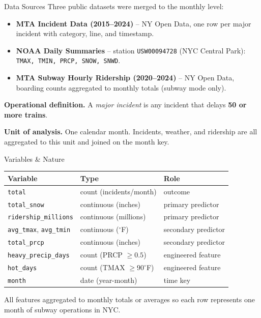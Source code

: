 \documentclass[aspectratio=43]{beamer}
\begin{document}
\begin{frame}{Data Sources}
Three public datasets were merged to the monthly level:
\begin{itemize}
  \item \textbf{MTA Incident Data (2015--2024)} -- NY Open Data, one row per major incident with category, line, and timestamp.
  \item \textbf{NOAA Daily Summaries} -- station \texttt{USW00094728} (NYC Central Park): \texttt{TMAX, TMIN, PRCP, SNOW, SNWD}.
  \item \textbf{MTA Subway Hourly Ridership (2020--2024)} -- NY Open Data, boarding counts aggregated to monthly totals (subway mode only).
\end{itemize}

\vspace{0.15cm}
\textbf{Operational definition.} A \emph{major incident} is any incident that delays \textbf{50 or more trains}.

\textbf{Unit of analysis.} One calendar month. Incidents, weather, and ridership are all aggregated to this unit and joined on the month key.
\end{frame}

\begin{frame}{Variables \& Nature}
\footnotesize
\begin{center}
\begin{tabular}{p{3.1cm}p{3.8cm}p{3.3cm}}
\toprule
\textbf{Variable} & \textbf{Type} & \textbf{Role} \\
\midrule
\texttt{total} & count (incidents/month) & outcome \\
\texttt{total\_snow} & continuous (inches) & primary predictor \\
\texttt{ridership\_millions} & continuous (millions) & primary predictor \\
\texttt{avg\_tmax}, \texttt{avg\_tmin} & continuous ($^{\circ}$F) & secondary predictor \\
\texttt{total\_prcp} & continuous (inches) & secondary predictor \\
\texttt{heavy\_precip\_days} & count (PRCP $\ge 0.5$) & engineered feature \\
\texttt{hot\_days} & count (TMAX $\ge 90^{\circ}$F) & engineered feature \\
\texttt{month} & date (year-month) & time key \\
\bottomrule
\end{tabular}
\end{center}

\vspace{0.2cm}
\small All features aggregated to monthly totals or averages so each row represents one month of subway operations in NYC.
\end{frame}
\end{document}
